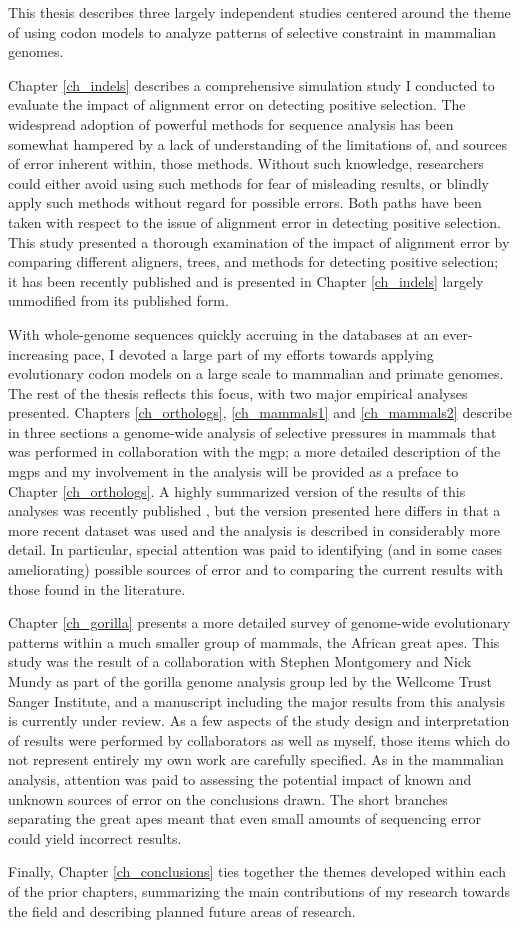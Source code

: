 This thesis describes three largely independent studies centered
around the theme of using codon models to analyze patterns of
selective constraint in mammalian genomes.

Chapter \ref{ch_indels} describes a comprehensive simulation study I
conducted to evaluate the impact of alignment error on detecting \sw
positive selection. The widespread adoption of powerful methods for
sequence analysis has been somewhat hampered by a lack of
understanding of the limitations of, and sources of error inherent
within, those methods. Without such knowledge, researchers could
either avoid using such methods for fear of misleading results, or
blindly apply such methods without regard for possible errors. Both
paths have been taken with respect to the issue of alignment error in
detecting positive selection. This study presented a thorough
examination of the impact of alignment error by comparing different
aligners, trees, and methods for detecting positive selection; it has
been recently published \citep{Jordan2011} and is presented in Chapter
\ref{ch_indels} largely unmodified from its published form.

With whole-genome sequences quickly accruing in the databases at an
ever-increasing pace, I devoted a large part of my efforts towards
applying evolutionary codon models on a large scale to mammalian and
primate genomes. The rest of the thesis reflects this focus, with two
major empirical analyses presented. Chapters \ref{ch_orthologs},
\ref{ch_mammals1} and \ref{ch_mammals2} describe in three sections a
genome-wide analysis of \sw selective pressures in mammals that was
performed in collaboration with the \ac{mgp}; a more detailed
description of the \acp{mgp} and my involvement in the analysis will
be provided as a preface to Chapter \ref{ch_orthologs}. A highly
summarized version of the results of this analyses was recently
published \citep{LindbladToh2011}, but the version presented here
differs in that a more recent dataset was used and the analysis is
described in considerably more detail. In particular, special
attention was paid to identifying (and in some cases ameliorating)
possible sources of error and to comparing the current results with
those found in the literature.

Chapter \ref{ch_gorilla} presents a more detailed survey of
genome-wide evolutionary patterns within a much smaller group of
mammals, the African great apes. This study was the result of a
collaboration with Stephen Montgomery and Nick Mundy as part of the
gorilla genome analysis group led by the Wellcome Trust Sanger
Institute, and a manuscript including the major results from this
analysis is currently under review. As a few aspects of the study
design and interpretation of results were performed by collaborators
as well as myself, those items which do not represent entirely my own
work are carefully specified. As in the mammalian analysis, attention
was paid to assessing the potential impact of known and unknown
sources of error on the conclusions drawn. The short branches
separating the great apes meant that even small amounts of sequencing
error could yield incorrect results.

Finally, Chapter \ref{ch_conclusions} ties together the themes
developed within each of the prior chapters, summarizing the main
contributions of my research towards the field and describing planned
future areas of research.
